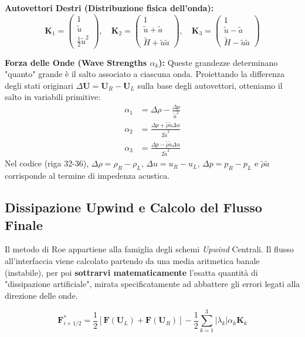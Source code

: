 \documentclass[11pt,a4paper]{article}
\begin{document}
\textbf{Autovettori Destri (Distribuzione fisica dell'onda):}
\begin{equation}
\mathbf{K}_1 = \begin{pmatrix} 1 \\ \tilde{u} \\ \frac{1}{2}\tilde{u}^2 \end{pmatrix}, \quad
\mathbf{K}_2 = \begin{pmatrix} 1 \\ \tilde{u} + \tilde{a} \\ \tilde{H} + \tilde{u}\tilde{a} \end{pmatrix}, \quad
\mathbf{K}_3 = \begin{pmatrix} 1 \\ \tilde{u} - \tilde{a} \\ \tilde{H} - \tilde{u}\tilde{a} \end{pmatrix}
\end{equation}

\textbf{Forza delle Onde (Wave Strengths $\alpha_k$):}
Queste grandezze determinano "quanto" grande è il salto associato a ciascuna onda. Proiettando la differenza degli stati originari $\Delta \mathbf{U} = \mathbf{U}_R - \mathbf{U}_L$ sulla base degli autovettori, otteniamo il salto in variabili primitive:
\begin{align}
\alpha_1 &= \Delta\rho - \frac{\Delta p}{\tilde{a}^2} \\
\alpha_2 &= \frac{\Delta p + \tilde{\rho} \tilde{a} \Delta u}{2 \tilde{a}^2} \\
\alpha_3 &= \frac{\Delta p - \tilde{\rho} \tilde{a} \Delta u}{2 \tilde{a}^2}
\end{align}
Nel codice (riga 32-36), $\Delta\rho = \rho_R - \rho_L$, $\Delta u = u_R - u_L$, $\Delta p = p_R - p_L$ e $\tilde{\rho} \tilde{a}$ corrisponde al termine di impedenza acustica.

\subsection{Dissipazione Upwind e Calcolo del Flusso Finale}
Il metodo di Roe appartiene alla famiglia degli schemi \textit{Upwind} Centrali. Il flusso all'interfaccia viene calcolato partendo da una media aritmetica banale (instabile), per poi \textbf{sottrarvi matematicamente} l'esatta quantità di "dissipazione artificiale", mirata specificatamente ad abbattere gli errori legati alla direzione delle onde.

\begin{equation}
\mathbf{F}^*_{i+1/2} = \frac{1}{2} \left[ \mathbf{F}(\mathbf{U}_L) + \mathbf{F}(\mathbf{U}_R) \right] - \frac{1}{2} \sum_{k=1}^3 |\lambda_k| \alpha_k \mathbf{K}_k
\end{equation}
\end{document}
